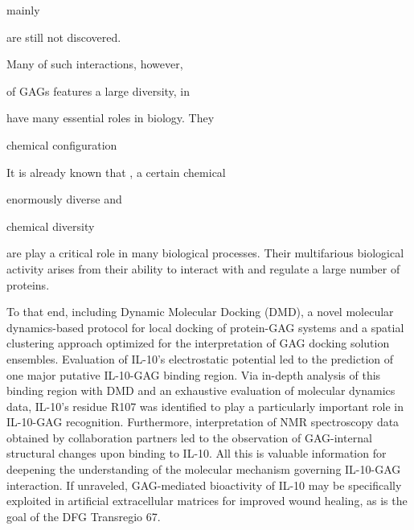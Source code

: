 mainly








are still
not discovered.


Many of such interactions, however,




of GAGs features a
large diversity, in


have many essential roles in biology. They

 chemical
configuration


It is already known that , a certain chemical




enormously diverse and

chemical diversity







are play a critical role in many biological processes.
Their multifarious biological activity arises from their ability to interact
with and regulate a large number of proteins.

  To that end, including Dynamic Molecular Docking
(DMD), a novel molecular dynamics-based protocol for local docking of
protein-GAG systems and a spatial clustering approach optimized for the
interpretation of GAG docking solution ensembles. Evaluation of IL-10's
electrostatic potential led to the prediction of one major putative IL-10-GAG
binding region. Via in-depth analysis of this binding region with DMD and an
exhaustive evaluation of molecular dynamics data, IL-10's residue R107 was
identified to play a particularly important role in IL-10-GAG recognition.
Furthermore, interpretation of NMR spectroscopy data obtained by collaboration
partners led to the observation of GAG-internal structural changes upon binding
to IL-10. All this is valuable information for deepening the understanding of
the molecular mechanism governing IL-10-GAG interaction. If unraveled,
GAG-mediated bioactivity of IL-10 may be specifically exploited in artificial
extracellular matrices for improved wound healing, as is the goal of the DFG
Transregio 67.

\lipsum[1-4]